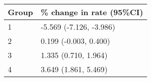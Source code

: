 \begin{tabular}{ll}
  \hline
Group & \% change in rate (95\%CI) \\ 
  \hline
   1 & -5.569 (-7.126, -3.986) \\ 
     2 & 0.199 (-0.003, 0.400) \\ 
     3 & 1.335 (0.710, 1.964) \\ 
     4 & 3.649 (1.861, 5.469) \\ 
   \hline
\end{tabular}

